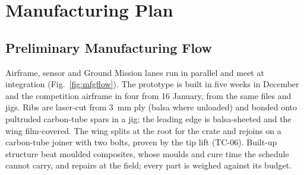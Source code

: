 \section{Manufacturing Plan}

\subsection{Preliminary Manufacturing Flow}
Airframe, sensor and Ground Mission lanes run in parallel and meet at integration (Fig.~\ref{fig:mfgflow}). The prototype is built in five weeks in December and the competition airframe in four from 16 January, from the same files and jigs. Ribs are laser-cut from 3~mm ply (balsa where unloaded) and bonded onto pultruded carbon-tube spars in a jig; the leading edge is balsa-sheeted and the wing film-covered. The wing splits at the root for the crate and rejoins on a carbon-tube joiner with two bolts, proven by the tip lift (TC-06). Built-up structure beat moulded composites, whose moulds and cure time the schedule cannot carry, and repairs at the field; every part is weighed against its budget.


